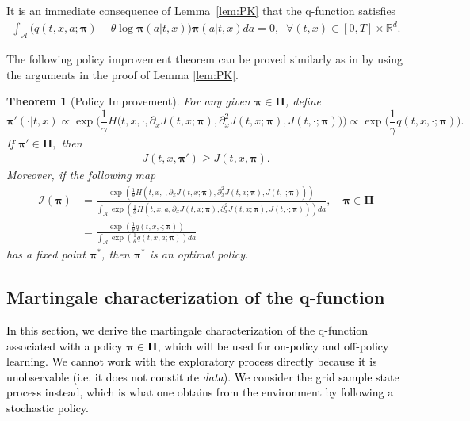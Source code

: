 \documentclass[11pt]{article}
\newtheorem{theorem}{Theorem}
\newcommand{\1}{\mathbbm{1}}
\newcommand{\rev}[1]{\textcolor{black}{{#1}}} %
\begin{document}
It is an immediate consequence of Lemma~\ref{lem:PK} that the q-function satisfies
\begin{align}\label{eq:q-eq}
\int_{\mathcal{A}} \big(q(t,x, a; \boldsymbol{\pi}) - \theta \log \boldsymbol{\pi}(a |t,x)\big)\boldsymbol{\pi}(a |t,x) da =0,\;\;\forall(t,x) \in [0, T] \times \mathbb{R}^d.
\end{align}


The following  policy improvement theorem can be proved similarly as in \cite[Theorem 2]{jia2022q} by using the arguments in the proof of Lemma \ref{lem:PK}.
\begin{theorem} [Policy Improvement] \label{thm:PI}
For any given $\boldsymbol{\pi} \in \boldsymbol{\Pi}$, define $$\boldsymbol{\pi}'(\cdot | t, x) \propto \exp \Big(\frac{1}{\gamma} H\big(t,x, \cdot, \partial_xJ(t,x; \boldsymbol{\pi} ),  \partial_x^2J(t,x; \boldsymbol{\pi}), J(t, \cdot; \boldsymbol{\pi})\big) \Big)  \propto \exp \Big(\frac{1}{\gamma} q(t,x, \cdot; \boldsymbol{\pi})\Big).$$ If $\boldsymbol{\pi}' \in \boldsymbol{\Pi},$ then
\begin{align}\label{eq:PI}
	J(t,x, \boldsymbol{\pi}' ) \ge J(t,x, \boldsymbol{\pi} ).
\end{align}
Moreover, if the following map
\begin{align}
	\mathcal{I} ( \boldsymbol{\pi} ) & = \frac{\exp(\frac{1}{\theta} H(t,x, \cdot, \partial_xJ(t,x; \boldsymbol{\pi} ),  \partial_{x}^2J(t,x; \boldsymbol{\pi}), J(t, \cdot; \boldsymbol{\pi})) ) }{\int_{\mathcal{A}} \exp (\frac{1}{\theta} H(t,x, a, \partial_xJ(t,x; \boldsymbol{\pi} ),  \partial_x^2J(t,x; \boldsymbol{\pi}), J(t, \cdot; \boldsymbol{\pi}))) da}, \quad \boldsymbol{\pi} \in \boldsymbol{\Pi} \\
	& = \frac{\exp (\frac{1}{\theta}  q(t,x, \cdot; \boldsymbol{\pi})) }{\int_{\mathcal{A}} \exp(\frac{1}{\theta} q(t,x, a; \boldsymbol{\pi})) da}
\end{align}
has a fixed point $\boldsymbol{\pi}^*$, then $\boldsymbol{\pi}^*$ is an optimal policy.
\end{theorem}

\subsection{Martingale characterization of the q-function}
\rev{In this section, we derive the martingale characterization of the q-function associated with a policy $\boldsymbol{\pi} \in \boldsymbol{\Pi}$, which will be used for on-policy and off-policy learning.  We cannot work with the exploratory process directly because it is unobservable (i.e. it does not constitute {\it data}). We consider the grid sample state process instead, which is what one obtains from the environment by following a stochastic policy.}
\end{document}
